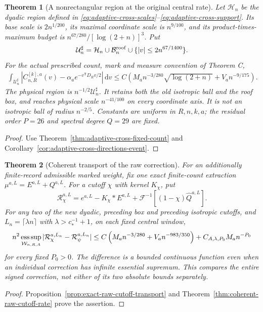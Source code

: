 \documentclass[11pt,reqno]{amsart}
\numberwithin{equation}{section}
\newtheorem{maintheorem}{Theorem}
\theoremstyle{definition}\newtheorem{definition}[theorem]{Definition}
\theoremstyle{remark}\newtheorem{remark}[theorem]{Remark}
\newcommand{\dd}{\,\mathrm d}\newcommand{\one}{\mathbf1}
\begin{document}
\begin{maintheorem}[A nonrectangular region at the original central rate]
\label{thm:intro-adaptive-cross}
Let $\mathcal H_n$ be the dyadic region defined in
\eqref{eq:adaptive-cross-scales}--\eqref{eq:adaptive-cross-support}.
Its base scale is $2n^{1/200}$, its maximal coordinate scale is
$n^{9/100}$, and its product-times-maximum budget is
$n^{67/280}/[\log(2+n)]^3$. Put
\[
 \mathcal U_n^\sharp=\mathcal H_n\cup\mathcal B_n^{\rm roof}
                         \cup\{|v|\le2n^{67/1400}\}.
\]
For the actual prescribed count, mark and measure convention of
Theorem C,
\begin{align*}
 \int_{\mathcal U_n^\sharp}
 |C^{[k],a}_{n,R}(v)-\alpha_a e^{-v^{\mathsf T}D_Rv/2}|\dd v
 \le C\left(M_an^{-3/280}\sqrt{\log(2+n)}+V_an^{-9/175}\right).
\end{align*}
The physical region is $n^{-1/2}\mathcal U_n^\sharp$. It retains
both the old isotropic ball and the roof box, and reaches physical
scale $n^{-41/100}$ on every coordinate axis. It is not an isotropic
ball of radius $n^{-2/5}$. Constants are uniform in $R,n,k,a$;
the residual order $P=26$ and spectral degree $Q=29$ are fixed.
\end{maintheorem}
\begin{proof}
Use Theorem~\ref{thm:adaptive-cross-fixed-count} and
Corollary~\ref{cor:adaptive-cross-directions-event}.
\end{proof}

\begin{maintheorem}[Coherent transport of the raw correction]
\label{thm:intro-coherent-raw-transport}
For an additionally finite-record admissible marked weight, fix one
exact finite-count extraction $\mu^{a,L}=E^{a,L}+Q^{a,L}$.
For a cutoff $\chi$ with kernel $K_\chi$, put
\[
 \mathcal R_\chi^{a,L}=e^{a,L}-K_\chi*E^{a,L}
            +\mathcal F^{-1}[(1-\chi)\widehat Q^{a,L}].
\]
For any two of the new dyadic, preceding box and preceding isotropic
cutoffs, and $L_n=\lceil\lambda n\rceil$ with
$\lambda>c_*^{-1}+1$, on each fixed central window,
\begin{align*}
 n^2\mathop{\rm ess\,sup}_{\mathcal W_{n,R,A}}
 |\mathcal R_\chi^{a,L_n}-\mathcal R_\psi^{a,L_n}|
 \le C\left(M_an^{-3/280}+V_an^{-983/350}\right)
        +C_{A,\lambda,P_0}M_an^{-P_0}
\end{align*}
for every fixed $P_0>0$. The difference is a bounded continuous
function even when an individual correction has infinite essential
supremum. This compares the entire signed correction, not either of
its two absolute bounds separately.
\end{maintheorem}
\begin{proof}
Proposition~\ref{prop:exact-raw-cutoff-transport} and
Theorem~\ref{thm:coherent-raw-cutoff-rate} prove the assertion.
\end{proof}
\end{document}
